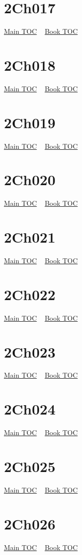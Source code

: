 \documentclass{book}
\begin{document}
  \section{2Ch017}\hyperlink{toc}{Main TOC} ~ \hyperref[subsec:2Ch]{Book TOC} 
  \section{2Ch018}\hyperlink{toc}{Main TOC} ~ \hyperref[subsec:2Ch]{Book TOC} 
  \section{2Ch019}\hyperlink{toc}{Main TOC} ~ \hyperref[subsec:2Ch]{Book TOC} 
  \section{2Ch020}\hyperlink{toc}{Main TOC} ~ \hyperref[subsec:2Ch]{Book TOC} 
  \section{2Ch021}\hyperlink{toc}{Main TOC} ~ \hyperref[subsec:2Ch]{Book TOC} 
  \section{2Ch022}\hyperlink{toc}{Main TOC} ~ \hyperref[subsec:2Ch]{Book TOC} 
  \section{2Ch023}\hyperlink{toc}{Main TOC} ~ \hyperref[subsec:2Ch]{Book TOC} 
  \section{2Ch024}\hyperlink{toc}{Main TOC} ~ \hyperref[subsec:2Ch]{Book TOC} 
  \section{2Ch025}\hyperlink{toc}{Main TOC} ~ \hyperref[subsec:2Ch]{Book TOC} 
  \section{2Ch026}\hyperlink{toc}{Main TOC} ~ \hyperref[subsec:2Ch]{Book TOC} 
\end{document}
